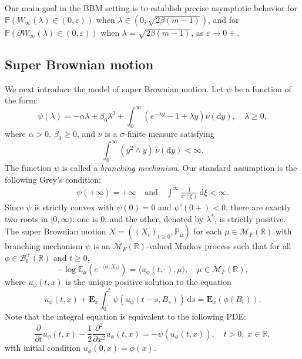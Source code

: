 \documentclass[11pt]{article}
\numberwithin{equation}{section}
\begin{document}
Our main goal in the BBM setting is to establish precise asymptotic behavior for $\mathbb{P}(W_\infty(\lambda) \in (0, \varepsilon))$ when $\lambda \in (0, \sqrt{2\beta(m-1)})$, and for $\mathbb{P}(\partial W_\infty(\lambda) \in (0, \varepsilon))$ when $\lambda = \sqrt{2\beta(m-1)}$, as $\varepsilon \to 0+$.


\subsection{Super Brownian motion}
We next introduce the model of super Brownian motion. Let $\psi$ be a function of the form:
\begin{equation}\label{branching mechan}
		\psi(\lambda) = -\alpha \lambda + 
        \beta_0\lambda^2 + \int_0^\infty \left(e^{-\lambda y} - 1 + \lambda y\right) \nu(\mathrm{d}y), \quad \lambda \ge 0,
\end{equation}
where $\alpha > 0$, $
\beta_0\ge 0$, and $\nu$ is a $\sigma$-finite measure satisfying
\[
\int_0^\infty (y^2 \wedge y) \, \nu(\mathrm{d}y) < \infty.
\]
The function $\psi$ is called a {\it branching mechanism}. Our standard assumption is the following Grey's condition:
\begin{align}\label{Grey's-condition}
	\psi(+\infty) = +\infty \quad \text{and} \quad \int^\infty \frac{1}{\psi(\xi)} \, \mathrm{d}\xi < \infty.
\end{align}
Since $\psi$ is strictly convex with $\psi(0) = 0$ and $\psi'(0+) < 0$, there are exactly two roots in $[0, \infty)$: one is $0$, and the other, denoted by $\lambda^*$, is strictly positive.  
The super Brownian motion $X = ((X_t)_{t \geq 0}, \mathbb{P}_\mu)$ for each $\mu \in \mathcal{M}_F(\mathbb{R})$ with branching mechanism $\psi$ is an $\mathcal{M}_F(\mathbb{R})$-valued Markov process such that for all $\phi \in \mathcal{B}_b^+(\mathbb{R})$ and $t \geq 0$,
\[
-\log \mathbb{E}_{\mu}\left(e^{-\langle \phi, X_t \rangle}\right) = \langle u_{\phi}(t, \cdot), \mu \rangle, \quad \mu \in \mathcal{M}_F(\mathbb{R}),
\]
where $u_{\phi}(t, x)$ is the unique positive solution to the equation
\[
u_{\phi}(t, x) + \mathbf{E}_x \int_0^t \psi(u_{\phi}(t - s, B_s)) \, \mathrm{d}s = \mathbf{E}_x(\phi(B_t)).
\]
Note that the integral equation is equivalent to the following PDE:
	\begin{equation*} 
		\frac{\partial}{\partial t} u_{\phi}(t, x) - \frac{1}{2} \frac{\partial^2}{\partial x^2} u_{\phi}(t, x) = -\psi(u_{\phi}(t, x)), \quad t > 0, \; x \in \mathbb{R},
\end{equation*} 
with initial condition $u_{\phi}(0, x) = \phi(x)$.
\end{document}
